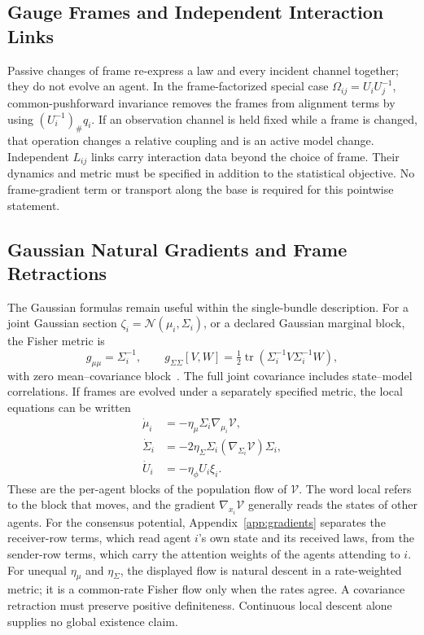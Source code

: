 \subsection{Gauge Frames and Independent Interaction Links}
\label{sec:frame_evolution}

Passive changes of frame re-express a law and every incident channel together; they do not evolve an agent. In the frame-factorized special case $\Omega_{ij}=U_iU_j^{-1}$, common-pushforward invariance removes the frames from alignment terms by using $(U_i^{-1})_\#q_i$. If an observation channel is held fixed while a frame is changed, that operation changes a relative coupling and is an active model change. Independent $L_{ij}$ links carry interaction data beyond the choice of frame. Their dynamics and metric must be specified in addition to the statistical objective. No frame-gradient term or transport along the base is required for this pointwise statement.

\subsection{Gaussian Natural Gradients and Frame Retractions}

The Gaussian formulas remain useful within the single-bundle description. For a joint Gaussian section $\zeta_i=\mathcal N(\mu_i,\Sigma_i)$, or a declared Gaussian marginal block, the Fisher metric is
\begin{equation}
g_{\mu\mu}=\Sigma_i^{-1},
\qquad
g_{\Sigma\Sigma}[V,W]=\tfrac12\operatorname{tr}(\Sigma_i^{-1}V\Sigma_i^{-1}W),
\end{equation}
with zero mean--covariance block~\cite{Amari2016}. The full joint covariance includes state--model correlations. If frames are evolved under a separately specified metric, the local equations can be written
\begin{align}
\dot\mu_i&=-\eta_\mu\Sigma_i\nabla_{\mu_i}\mathcal V,\\
\dot\Sigma_i&=-2\eta_\Sigma\Sigma_i(\nabla_{\Sigma_i}\mathcal V)\Sigma_i,\\
\dot U_i&=-\eta_\phi U_i\xi_i.
\label{eq:gauge_natural_gradient}
\end{align}
These are the per-agent blocks of the population flow of $\mathcal V$. The word local refers to the block that moves, and the gradient $\nabla_{x_i}\mathcal V$ generally reads the states of other agents. For the consensus potential, Appendix~\ref{app:gradients} separates the receiver-row terms, which read agent $i$'s own state and its received laws, from the sender-row terms, which carry the attention weights of the agents attending to $i$. For unequal $\eta_\mu$ and $\eta_\Sigma$, the displayed flow is natural descent in a rate-weighted metric; it is a common-rate Fisher flow only when the rates agree. A covariance retraction must preserve positive definiteness. Continuous local descent alone supplies no global existence claim.

